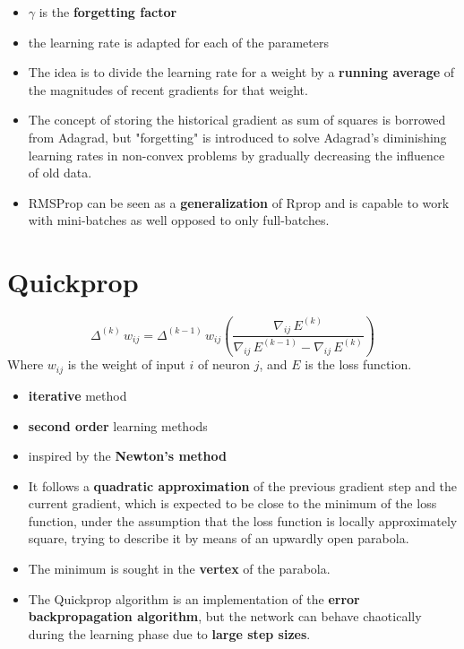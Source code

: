 \begin{itemize}
    \item ${\displaystyle \gamma}$ is the \textbf{forgetting factor}

    \item the learning rate is adapted for each of the parameters

    \item The idea is to divide the learning rate for a weight by a \textbf{running average} of the magnitudes of recent gradients for that weight.

    \item The concept of storing the historical gradient as sum of squares is borrowed from Adagrad, but "forgetting" is introduced to solve Adagrad's diminishing learning rates in non-convex problems by gradually decreasing the influence of old data.

    \item RMSProp can be seen as a \textbf{generalization} of Rprop and is capable to work with mini-batches as well opposed to only full-batches.
\end{itemize}



\section{Quickprop \cite{wiki-Quickprop}}\label{Quickprop}

\[
    {\displaystyle \Delta ^{(k)}\,w_{ij}=\Delta ^{(k-1)}\,w_{ij}\left({\frac {\nabla _{ij}\,E^{(k)}}{\nabla _{ij}\,E^{(k-1)}-\nabla _{ij}\,E^{(k)}}}\right)}
\]
Where ${\displaystyle w_{ij}}$ is the weight of input ${\displaystyle i}$ of neuron ${\displaystyle j}$, and ${\displaystyle E}$ is the loss function.

\begin{itemize}
    \item \textbf{iterative} method
    
    \item \textbf{second order} learning methods
    
    \item inspired by the \textbf{Newton's method}
    
    \item It follows a \textbf{quadratic approximation} of the previous gradient step and the current gradient, which is expected to be close to the minimum of the loss function, under the assumption that the loss function is locally approximately square, trying to describe it by means of an upwardly open parabola. 
    
    \item The minimum is sought in the \textbf{vertex} of the parabola.

    \item The Quickprop algorithm is an implementation of the \textbf{error backpropagation algorithm}, but the network can behave chaotically during the learning phase due to \textbf{large step sizes}.
\end{itemize}



